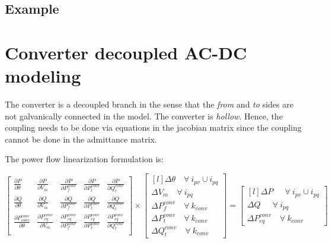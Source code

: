 \documentclass[11pt]{article}
\begin{document}
	\subsection{Example}
	
	

	\newpage
	\section{Converter decoupled AC-DC modeling}
	
	The converter is a decoupled branch in the sense that the \textit{from} and \textit{to} sides are not galvanically connected in the model. The converter is \textit{hollow}. Hence, the coupling needs to be done via equations in the jacobian matrix since the coupling cannot be done in the admittance matrix.
	

	The power flow linearization formulation is:
	
	\begin{equation}
		\label{eq:acdc_syst}
		\begin{bmatrix}
			\frac{\partial P}{\partial \theta} & \frac{\partial P}{\partial V_m} & \frac{\partial P}{\partial P_f^{conv}} & \frac{\partial P}{\partial P_t^{conv}} & \frac{\partial P}{\partial Q_t^{conv}}\\
			\frac{\partial Q}{\partial \theta} & \frac{\partial Q}{\partial V_m} & \frac{\partial Q}{\partial P_f^{conv}} & \frac{\partial Q}{\partial P_t^{conv}} & \frac{\partial Q}{\partial Q_t^{conv}}\\
			\frac{\partial P_{conv}^{conv}}{\partial \theta} & \frac{\partial P_{eq}^{conv}}{\partial V_m} & \frac{\partial P_{eq}^{conv}}{\partial P_f^{conv}} & \frac{\partial P_{eq}^{conv}}{\partial P_t^{conv}} & \frac{\partial P_{eq}^{conv}}{\partial Q_t^{conv}}\\
		\end{bmatrix}	
		\times 
		\begin{bmatrix*}[l]
			\Delta \theta  \quad \forall \ i_{pv} \cup i_{pq}   \\
			\Delta V_m     \quad \forall \ i_{pq}  \\
			\Delta P_f^{conv}     \quad \forall \ k_{conv} \\
			\Delta P_t^{conv}     \quad \forall \ k_{conv} \\
			\Delta Q_t^{conv}     \quad \forall \ k_{conv}
		\end{bmatrix*}
		= 
		\begin{bmatrix*}[l]
			\Delta P \quad \ \ \forall \ i_{pv} \cup i_{pq} \\
			\Delta Q \quad \ \ \forall \ i_{pq}  \\
			\Delta P_{eq}^{conv} \quad \forall \ k_{conv} 
		\end{bmatrix*}
	\end{equation}
\end{document}
